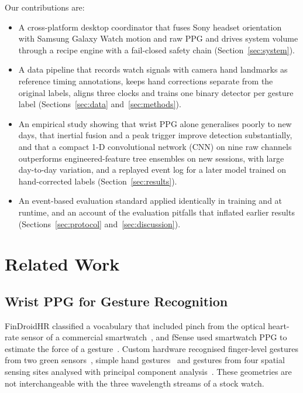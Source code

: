 Our contributions are:
\begin{itemize}
  \item A cross-platform desktop coordinator that fuses Sony headset orientation with Samsung Galaxy Watch motion and raw PPG and drives system volume through a recipe engine with a fail-closed safety chain (Section~\ref{sec:system}).
  \item A data pipeline that records watch signals with camera hand landmarks as reference timing annotations, keeps hand corrections separate from the original labels, aligns three clocks and trains one binary detector per gesture label (Sections~\ref{sec:data} and~\ref{sec:methods}).
  \item An empirical study showing that wrist PPG alone generalises poorly to new days, that inertial fusion and a peak trigger improve detection substantially, and that a compact 1-D convolutional network (CNN) on nine raw channels outperforms engineered-feature tree ensembles on new sessions, with large day-to-day variation, and a replayed event log for a later model trained on hand-corrected labels (Section~\ref{sec:results}).
  \item An event-based evaluation standard applied identically in training and at runtime, and an account of the evaluation pitfalls that inflated earlier results (Sections~\ref{sec:protocol} and~\ref{sec:discussion}).
\end{itemize}

\section{Related Work}\label{sec:related}

\subsection{Wrist PPG for Gesture Recognition}

FinDroidHR classified a vocabulary that included pinch from the optical heart-rate sensor of a commercial smartwatch~\cite{zhang2018findroidhr}, and fSense used smartwatch PPG to estimate the force of a gesture~\cite{buddhika2019fsense}. Custom hardware recognised finger-level gestures from two green sensors~\cite{zhao2018ppg}, simple hand gestures~\cite{subramanian2020ppg} and gestures from four spatial sensing sites analysed with principal component analysis~\cite{ruan2022pca}. These geometries are not interchangeable with the three wavelength streams of a stock watch.

